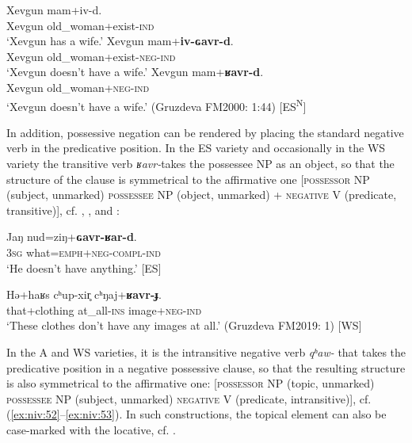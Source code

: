 \documentclass[output=paper,colorlinks,citecolor=brown]{langscibook}
\begin{document}
\ea\label{ex:niv:49}
    \ea\label{ex:niv:49a}
        \gll Xevgun mam+iv-d. \\ 
             Xevgun old\_woman+exist-\textsc{ind} \\
        \glt ‘Xevgun has a wife.’
    \ex\label{ex:niv:49b}
        \gll Xevgun mam+\textbf{iv-ɢavr-d}. \\
             Xevgun old\_woman+exist-\textsc{neg-ind} \\
        \glt ‘Xevgun doesn’t have a wife.’
    \ex\label{ex:niv:49c}
        \gll Xevgun mam+\textbf{ʁavr-d}. \\
             Xevgun old\_woman+\textsc{neg-ind}\\
        \glt ‘Xevgun doesn’t have a wife.’ (Gruzdeva FM2000: 1:44) [ES\textsuperscript{N}]
    \z
\z 

In addition, possessive negation can be rendered by placing the standard negative verb in the predicative position. In the ES variety and occasionally in the WS variety the transitive verb \textit{ʁavr-}takes the possessee NP as an object, so that the structure of the clause is symmetrical to the affirmative one [\textsc{possessor} \textsc{NP} (subject, unmarked) \textsc{possessee} \textsc{NP} (object, unmarked) + \textsc{negative} \textsc{V} (predicate, transitive)], cf. , , and :

\ea\label{ex:niv:50}
    \gll Jaŋ nud=ziŋ+\textbf{ɢavr-ʁar-d}. \\ 
          \textsc{3sg} what=\textsc{emph}+\textsc{neg-compl-ind} \\
    \glt ‘He doesn’t have anything.’ [ES]
\z 

\ea\label{ex:niv:51}
    \gll Hə+haʁs cʰup-xir̥ cʰŋaj+\textbf{ʁavr-ɟ}. \\ 
         that+clothing at\_all-\textsc{ins} image+\textsc{neg}{}-\textsc{ind} \\
    \glt ‘These clothes don’t have any images at all.’ (Gruzdeva FM2019: 1) [WS]
\z 

In the A and WS varieties, it is the intransitive negative verb \textit{qʰaw-} that takes the predicative position in a negative possessive clause, so that the resulting structure is also symmetrical to the affirmative one: [\textsc{possessor} NP (topic, unmarked) \textsc{possessee} NP (subject, unmarked) \textsc{negative} V (predicate, intransitive)], cf. (\ref{ex:niv:52}--\ref{ex:niv:53}). In such constructions, the topical element can also be case-marked with the locative, cf. .
\end{document}
